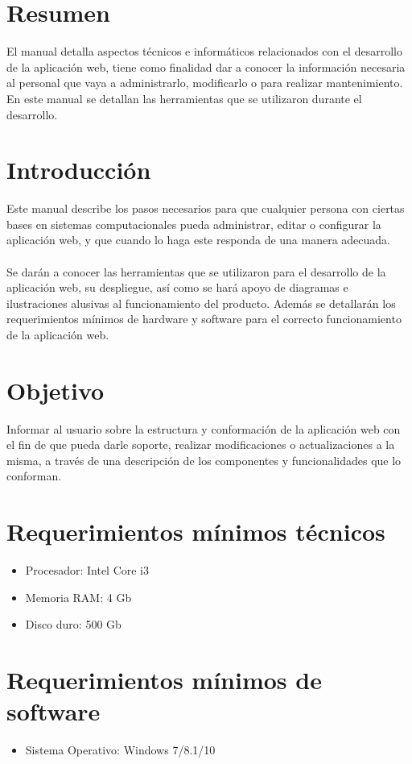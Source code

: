 \documentclass[12pt, a4paper, titlepage]{article}
\begin{document}
	\section{Resumen}
	El manual detalla aspectos técnicos e informáticos relacionados con el desarrollo de la aplicación web, tiene como finalidad dar a conocer la información necesaria al personal que vaya a administrarlo, modificarlo o para realizar mantenimiento. En este manual se detallan las herramientas que se utilizaron durante el desarrollo. 
	\newpage
	\section{Introducción}
	Este manual describe los pasos necesarios para que cualquier persona con ciertas bases en sistemas computacionales pueda administrar, editar o configurar la aplicación web, y que cuando lo haga este responda de una manera adecuada.\\\\
	Se darán a conocer las herramientas que se utilizaron para el desarrollo de la aplicación web, su despliegue, así como se hará apoyo de diagramas e ilustraciones alusivas al funcionamiento del producto.	Además se detallarán los requerimientos mínimos de hardware y software para el correcto funcionamiento de la aplicación web.
	\section{Objetivo}
	Informar al usuario sobre la estructura y conformación de la aplicación web con el fin de que pueda darle soporte, realizar modificaciones o actualizaciones a la misma, a través de una descripción de los componentes y funcionalidades que lo conforman.
	\newpage
	\section{Requerimientos mínimos técnicos}
	\begin{itemize}
		\item Procesador: Intel Core i3
		\item Memoria RAM: 4 Gb
		\item Disco duro: 500 Gb		
	\end{itemize}
	\section{Requerimientos mínimos de software}
	\begin{itemize}
		\item Sistema Operativo: Windows 7/8.1/10	
	\end{itemize}
	\newpage
\end{document}
